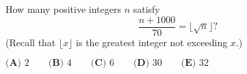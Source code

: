 How many positive integers $n$ satisfy$$\dfrac{n+1000}{70} = \lfloor \sqrt{n} \rfloor?$$(Recall that $\lfloor x\rfloor$ is the greatest integer not exceeding $x$.)

$\textbf{(A) } 2 \qquad\textbf{(B) } 4 \qquad\textbf{(C) } 6 \qquad\textbf{(D) } 30 \qquad\textbf{(E) } 32$